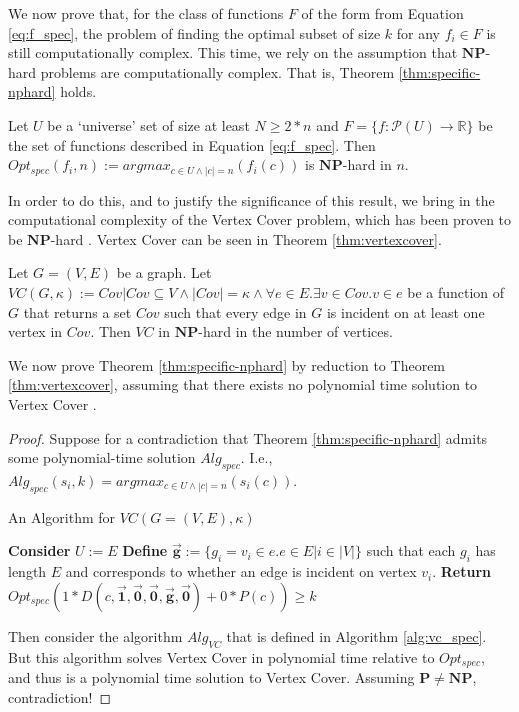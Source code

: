 We now prove that, for the class of functions $F$ of the form from Equation \ref{eq:f_spec}, the problem of finding the optimal subset of size $k$ for any $f_i \in F$ is still computationally complex. This time, we rely on the assumption that $\mathbf{NP}$-hard problems are computationally complex. That is, Theorem \ref{thm:specific-nphard} holds. 

\begin{theorem}\label{thm:specific-nphard}
    Let $U$ be a `universe' set of size at least $N \geq 2*n$ and $F = \{f: \mathcal{P} (U) \rightarrow \mathbb{R}\}$ be the set of functions described in Equation \ref{eq:f_spec}. Then $Opt_{spec}(f_i, n) := argmax_{c \in U \land |c| = n}(f_i(c))$ is $\mathbf{NP}$-hard in $n$.
\end{theorem}

In order to do this, and to justify the significance of this result, we bring in the computational complexity of the Vertex Cover problem, which has been proven to be $\mathbf{NP}$-hard \cite{COPPERSMITH198527}. Vertex Cover can be seen in Theorem \ref{thm:vertexcover}.

\begin{theorem}\label{thm:vertexcover}
    Let $G = (V, E)$ be a graph. Let $VC(G, \kappa) := Cov | Cov \subseteq V \land |Cov| = \kappa \land \forall e \in E . \exists v \in Cov . v \in e$ be a function of $G$ that returns a set $Cov$ such that every edge in $G$ is incident on at least one vertex in $Cov$. Then $VC$ in $\mathbf{NP}$-hard in the number of vertices.
\end{theorem}

We now prove Theorem \ref{thm:specific-nphard} by reduction to Theorem \ref{thm:vertexcover}, assuming that there exists no polynomial time solution to Vertex Cover \cite{COPPERSMITH198527}.

\begin{proof}
Suppose for a contradiction that Theorem \ref{thm:specific-nphard} admits some polynomial-time solution $Alg_{spec}$. I.e., $Alg_{spec}(s_i, k )= argmax_{c \in U \land |c| = n}(s_i(c))$.

\begin{algorithm}
    \caption{An Algorithm for $VC(G = (V,E), \kappa)$}\label{alg:vc_spec}
    \begin{algorithmic}
        \State \textbf{Consider} $U := E$
        \State \textbf{Define} $\vec{\mathbf{g}} := \{g_i = v_i \in e . e \in E | i \in |V|\}$ such that each $g_i$ has length $E$ and corresponds to whether an edge is incident on vertex $v_i$.
        \State \textbf{Return} $Opt_{spec}(1*D(c, \vec{\mathbf{1}}, \vec{\mathbf{0}}, \vec{\mathbf{0}}, \vec{\mathbf{g}}, \vec{\mathbf{0}})+ 0*P(c)) \geq k$
    \end{algorithmic}
\end{algorithm}

Then consider the algorithm $Alg_{VC}$ that is defined in Algorithm \ref{alg:vc_spec}. But this algorithm solves Vertex Cover in polynomial time relative to $Opt_{spec}$, and thus is a polynomial time solution to Vertex Cover. Assuming $\mathbf{P} \neq \mathbf{NP}$, contradiction!
\end{proof}

